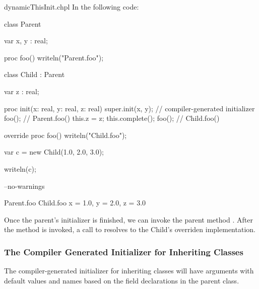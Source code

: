 \begin{chapelexample}{dynamicThisInit.chpl}
In the following code:
\begin{chapel}
class Parent {
  var x, y : real;

  proc foo() {
    writeln("Parent.foo");
  }
}

class Child : Parent {
  var z : real;

  proc init(x: real, y: real, z: real) {
    super.init(x, y); // compiler-generated initializer
    foo(); // Parent.foo()
    this.z = z;
    this.complete();
    foo(); // Child.foo()
  }

  override proc foo() {
    writeln("Child.foo");
  }
}

var c = new Child(1.0, 2.0, 3.0);
\end{chapel}
\begin{chapelpost}
writeln(c);
\end{chapelpost}
\begin{chapelcompopts}
--no-warnings
\end{chapelcompopts}
\begin{chapelprintoutput}
Parent.foo
Child.foo
{x = 1.0, y = 2.0, z = 3.0}
\end{chapelprintoutput}
Once the parent's initializer is finished, we can invoke the parent method
. After the  method is invoked, a call to 
resolves to the Child's overriden implementation.
\end{chapelexample}

\subsubsection{The Compiler Generated Initializer for Inheriting Classes}
\label{The_Compiler_Generated_Initializer_for_Inheriting_Classes}

The compiler-generated initializer for inheriting classes will have arguments
with default values and names based on the field declarations in the parent
class.

